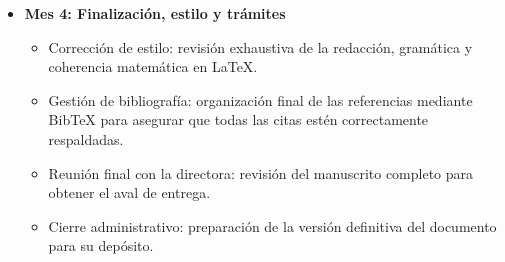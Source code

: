 \documentclass{article}
\begin{document}
\begin{itemize}
\begin{itemize}
\begin{itemize}
                \end{itemize}
             \item \textbf{Mes 4: Finalización, estilo y trámites}
                \begin{itemize}
                   \item Corrección de estilo: revisión exhaustiva de la redacción, gramática y coherencia matemática en \LaTeX .
                   \item Gestión de bibliografía: organización final de las referencias mediante BibTeX para asegurar que todas las citas estén correctamente respaldadas.
                   \item Reunión final con la directora: revisión del manuscrito completo para obtener el aval de entrega.
                   \item Cierre administrativo: preparación de la versión definitiva del documento para su depósito.
                \end{itemize}
          \end{itemize}
    \end{itemize}

    \nocite{*}
    
    
\end{document}
